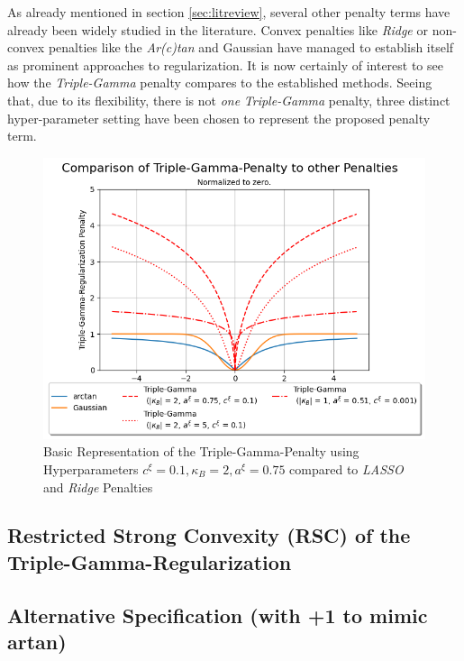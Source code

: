 \documentclass[12pt,a4paper]{article}
\begin{document}
As already mentioned in section \ref{sec:litreview}, several other penalty terms have already been widely studied in the literature. Convex penalties like \textit{Ridge} \parencite{HoerlKennard1970a} or non-convex penalties like the \textit{Ar(c)tan} \parencite{WangZhu2016} and Gaussian \parencite{JohnVettamWu2022} have managed to establish itself as prominent approaches to regularization. It is now certainly of interest to see how the \textit{Triple-Gamma} penalty compares to the established methods. Seeing that, due to its flexibility, there is not \textit{one} \textit{Triple-Gamma} penalty, three distinct hyper-parameter setting have been chosen to represent the proposed penalty term. 

\begin{figure}[!h]
\centering
\includegraphics[scale=0.75]{../02_simulation/021_simulation_figures/TGPenalty_Comparison.png}
\caption{Basic Representation of the Triple-Gamma-Penalty using Hyperparameters $c^\xi = 0.1, \kappa_B = 2, a^\xi = 0.75$ compared to \textit{LASSO} and \textit{Ridge} Penalties}
\label{fig:basicTGPen}
\end{figure}

\subsection{Restricted Strong Convexity (RSC) of the Triple-Gamma-Regularization}

\subsection{Alternative Specification (with +1 to mimic artan)}
\end{document}
